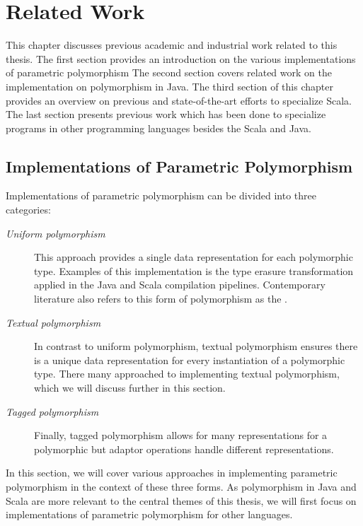
\chapter{Related Work}

This chapter discusses previous academic and industrial work related to this thesis. 
The first section provides an introduction on the various implementations of parametric polymorphism
The second section covers related work on the implementation on polymorphism in Java.
The third section of this chapter provides an overview on previous and state-of-the-art efforts to specialize Scala.
The last section presents previous work which has been done to specialize programs in other programming languages besides the Scala and Java.

\section{Implementations of Parametric Polymorphism}

Implementations of parametric polymorphism can be divided into three categories\cite{types-of-polymorphism}:

\begin{description}
	\item[\textit{Uniform polymorphism}] 
	This approach provides a single data representation for each polymorphic type. 
	Examples of this implementation is the type erasure transformation applied in the Java and Scala compilation pipelines.
	Contemporary literature also refers to this form of polymorphism as the .
	\item[\textit{Textual polymorphism}]
	In contrast to uniform polymorphism, textual polymorphism ensures there is a unique data representation for every instantiation of a polymorphic type.
	There many approached to implementing textual polymorphism, which we will discuss further in this section.
	\item[\textit{Tagged polymorphism}] 
	Finally, tagged polymorphism allows for many representations for a polymorphic but adaptor operations handle different representations.
\end{description}

In this section, we will cover various approaches in implementing parametric polymorphism in the context of these three forms.
As polymorphism in Java and Scala are more relevant to the central themes of this thesis, we will first focus on implementations of parametric polymorphism for other languages.


